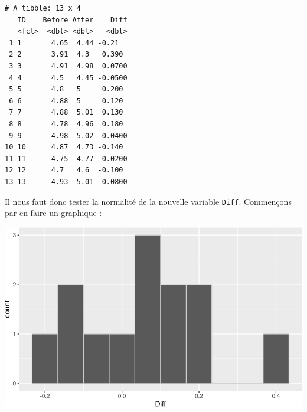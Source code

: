 \documentclass[
  a4paper,
]{article}
\newenvironment{Shaded}{\begin{snugshade}}{\end{snugshade}}
\newcommand{\DataTypeTok}[1]{\textcolor[rgb]{0.00,0.34,0.68}{#1}}
\newcommand{\DecValTok}[1]{\textcolor[rgb]{0.69,0.50,0.00}{#1}}
\newcommand{\FloatTok}[1]{\textcolor[rgb]{0.69,0.50,0.00}{#1}}
\newcommand{\KeywordTok}[1]{\textcolor[rgb]{0.12,0.11,0.11}{\textbf{#1}}}
\newcommand{\NormalTok}[1]{\textcolor[rgb]{0.12,0.11,0.11}{#1}}
\newcommand{\OperatorTok}[1]{\textcolor[rgb]{0.12,0.11,0.11}{#1}}
\newcommand{\StringTok}[1]{\textcolor[rgb]{0.75,0.01,0.01}{#1}}
\begin{document}
\begin{Shaded}
\end{Shaded}

\begin{verbatim}
# A tibble: 13 x 4
   ID    Before After    Diff
   <fct>  <dbl> <dbl>   <dbl>
 1 1       4.65  4.44 -0.21  
 2 2       3.91  4.3   0.390 
 3 3       4.91  4.98  0.0700
 4 4       4.5   4.45 -0.0500
 5 5       4.8   5     0.200 
 6 6       4.88  5     0.120 
 7 7       4.88  5.01  0.130 
 8 8       4.78  4.96  0.180 
 9 9       4.98  5.02  0.0400
10 10      4.87  4.73 -0.140 
11 11      4.75  4.77  0.0200
12 12      4.7   4.6  -0.100 
13 13      4.93  5.01  0.0800
\end{verbatim}

Il nous faut donc tester la normalité de la nouvelle variable \texttt{Diff}. Commençons par en faire un graphique :

\begin{Shaded}
\end{Shaded}

\begin{center}\includegraphics[width=0.9\linewidth]{figure/unnamed-chunk-38-1} \end{center}
\end{document}
